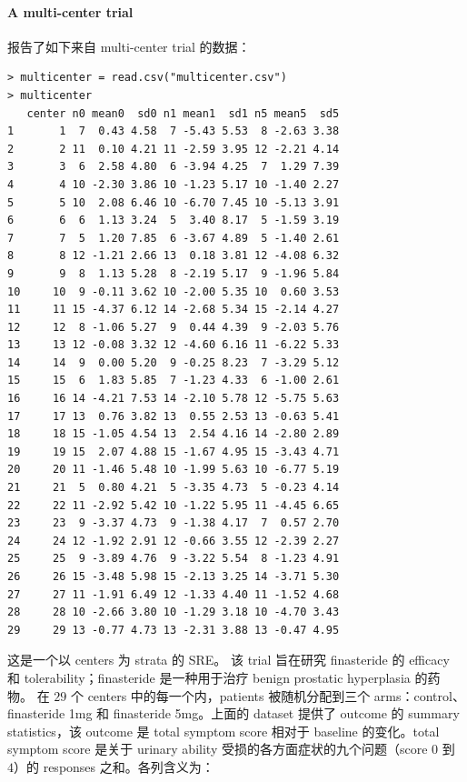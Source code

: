 \paragraph{A multi-center trial}

\citet[][Table 1]{gould1998multi} 报告了如下来自 multi-center trial 的数据：

\begin{lstlisting}
> multicenter = read.csv("multicenter.csv")
> multicenter
   center n0 mean0  sd0 n1 mean1  sd1 n5 mean5  sd5
1       1  7  0.43 4.58  7 -5.43 5.53  8 -2.63 3.38
2       2 11  0.10 4.21 11 -2.59 3.95 12 -2.21 4.14
3       3  6  2.58 4.80  6 -3.94 4.25  7  1.29 7.39
4       4 10 -2.30 3.86 10 -1.23 5.17 10 -1.40 2.27
5       5 10  2.08 6.46 10 -6.70 7.45 10 -5.13 3.91
6       6  6  1.13 3.24  5  3.40 8.17  5 -1.59 3.19
7       7  5  1.20 7.85  6 -3.67 4.89  5 -1.40 2.61
8       8 12 -1.21 2.66 13  0.18 3.81 12 -4.08 6.32
9       9  8  1.13 5.28  8 -2.19 5.17  9 -1.96 5.84
10     10  9 -0.11 3.62 10 -2.00 5.35 10  0.60 3.53
11     11 15 -4.37 6.12 14 -2.68 5.34 15 -2.14 4.27
12     12  8 -1.06 5.27  9  0.44 4.39  9 -2.03 5.76
13     13 12 -0.08 3.32 12 -4.60 6.16 11 -6.22 5.33
14     14  9  0.00 5.20  9 -0.25 8.23  7 -3.29 5.12
15     15  6  1.83 5.85  7 -1.23 4.33  6 -1.00 2.61
16     16 14 -4.21 7.53 14 -2.10 5.78 12 -5.75 5.63
17     17 13  0.76 3.82 13  0.55 2.53 13 -0.63 5.41
18     18 15 -1.05 4.54 13  2.54 4.16 14 -2.80 2.89
19     19 15  2.07 4.88 15 -1.67 4.95 15 -3.43 4.71
20     20 11 -1.46 5.48 10 -1.99 5.63 10 -6.77 5.19
21     21  5  0.80 4.21  5 -3.35 4.73  5 -0.23 4.14
22     22 11 -2.92 5.42 10 -1.22 5.95 11 -4.45 6.65
23     23  9 -3.37 4.73  9 -1.38 4.17  7  0.57 2.70
24     24 12 -1.92 2.91 12 -0.66 3.55 12 -2.39 2.27
25     25  9 -3.89 4.76  9 -3.22 5.54  8 -1.23 4.91
26     26 15 -3.48 5.98 15 -2.13 3.25 14 -3.71 5.30
27     27 11 -1.91 6.49 12 -1.33 4.40 11 -1.52 4.68
28     28 10 -2.66 3.80 10 -1.29 3.18 10 -4.70 3.43
29     29 13 -0.77 4.73 13 -2.31 3.88 13 -0.47 4.95
\end{lstlisting}


这是一个以 centers 为 strata 的 SRE。
该 trial 旨在研究 finasteride 的 efficacy 和 tolerability；finasteride 是一种用于治疗 benign prostatic hyperplasia 的药物。
在 $29$ 个 centers 中的每一个内，patients 被随机分配到三个 arms：control、finasteride 1mg 和 finasteride 5mg。上面的 dataset
提供了 outcome 的 summary statistics，该 outcome 是 total symptom score 相对于 baseline 的变化。total symptom score 是关于 urinary ability 受损的各方面症状的九个问题（score $0$ 到 $4$）的 responses 之和。各列含义为：

